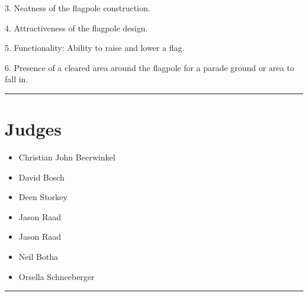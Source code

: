 \documentclass[10pt]{article}
\begin{document}
3. Neatness of the flagpole construction.

4. Attractiveness of the flagpole design.

5. Functionality: Ability to raise and lower a flag.

6. Presence of a cleared area around the flagpole for a parade ground or area to fall in.


\vspace{0.5cm}
	\hrule
	\vspace{0.5cm}
		\section*{\faUsers \: Judges}

		

	\begin{multicols}{2}

		\begin{itemize}
									\item Christian John Beerwinkel
									\item David Bosch
									\item Deen Storkey
									\item Jason Raad
						\end{itemize}

		\vfill\null
		\columnbreak

		\begin{itemize}
									\item Jason Raad
									\item Neil Botha
									\item Orsella Schneeberger
						\end{itemize}

		\vfill\null

		\end{multicols}



			\vspace{0.5cm}
	\hrule
	\vspace{0.5cm}
\end{document}
